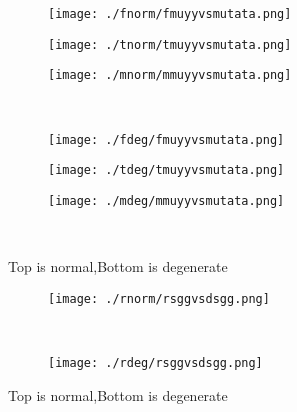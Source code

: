 \documentclass[aps,floats,floatfix,nofootinbib]{revtex4-1}
\begin{document}
\begin{center}
\begin{figure}
\begin{subfigure}{0.3\textwidth}
\texttt{[image: ./fnorm/fmuyyvsmutata.png]}
\label{}
\end{subfigure}
\begin{subfigure}{0.3\textwidth}
\texttt{[image: ./tnorm/tmuyyvsmutata.png]}
\label{}
\end{subfigure}
\begin{subfigure}{0.3\textwidth}
\texttt{[image: ./mnorm/mmuyyvsmutata.png]}
\label{}
\end{subfigure}\\
\begin{subfigure}{0.3\textwidth}
\texttt{[image: ./fdeg/fmuyyvsmutata.png]}
\label{}
\end{subfigure}
\begin{subfigure}{0.3\textwidth}
\texttt{[image: ./tdeg/tmuyyvsmutata.png]}
\label{}
\end{subfigure}
\begin{subfigure}{0.3\textwidth}
\texttt{[image: ./mdeg/mmuyyvsmutata.png]}
\label{}
\end{subfigure}\\
\caption{Top is normal,Bottom is degenerate}
\end{figure}
\end{center}

\begin{center}
\begin{figure}
\begin{subfigure}{0.95\textwidth}
\texttt{[image: ./rnorm/rsggvsdsgg.png]}
\label{}
\end{subfigure}\\
\begin{subfigure}{0.95\textwidth}
\texttt{[image: ./rdeg/rsggvsdsgg.png]}
\label{}
\end{subfigure}
\caption{Top is normal,Bottom is degenerate}
\end{figure}
\end{center}
\end{document}
